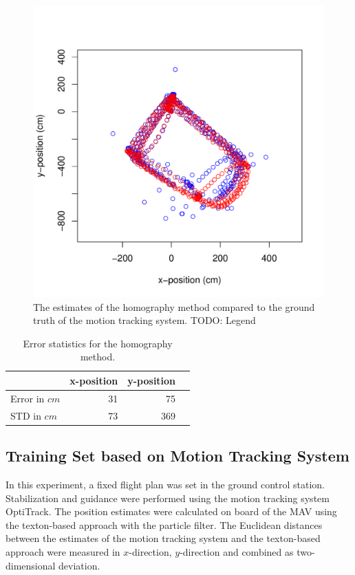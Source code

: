 \documentclass[11pt]{report}
\begin{document}
\begin{figure}[h!]
\begin{center}
\includegraphics[width=0.7\columnwidth]{SIFT_vs_OptiTrack}
\caption{{\label{fig:siftestimates} The estimates of the homography
    method compared to the ground truth of the motion tracking system.
    TODO: Legend%
  }}
\end{center}
\end{figure}


\begin{table}[H]
  \centering
  \begin{tabular}{lrrr}
    \toprule
    & x-position & y-position\\
    \midrule
    Error in $cm$ & 31 & 75\\
    STD in $cm$ & 73 & 369\\
    \bottomrule
  \end{tabular}
  \caption[Error statistics homography method.]{Error statistics for the homography method.}
  \label{tab:homoerror}
\end{table}


\subsection{Training Set based on Motion Tracking System}
\label{sec:experiment-real}

In this experiment, a fixed flight plan was set in the ground control
station. Stabilization and guidance were performed using the motion
tracking system OptiTrack. The position estimates were calculated on
board of the MAV using the texton-based approach with the particle
filter. The Euclidean distances between the estimates of the motion
tracking system and the texton-based approach were measured in
$x$-direction, $y$-direction and combined as two-dimensional
deviation.
\end{document}
